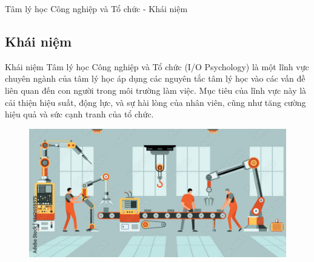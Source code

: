 \documentclass[../main.tex]{subfiles}
\begin{document}
\begin{frame}{Tâm lý học Công nghiệp và Tổ chức - Khái niệm}

\subsection{Khái niệm}
\begin{block}{Khái niệm}
    Tâm lý học Công nghiệp và Tổ chức (I/O Psychology) là một lĩnh vực chuyên ngành của tâm lý học áp dụng các nguyên tắc tâm lý học vào các vấn đề liên quan đến con người trong môi trường làm việc. Mục tiêu của lĩnh vực này là cải thiện hiệu suất, động lực, và sự hài lòng của nhân viên, cũng như tăng cường hiệu quả và sức cạnh tranh của tổ chức.
\end{block}
\begin{figure}
    \centering
    \includegraphics[width=0.7\linewidth]{anh/assembly_line.jpg}
\end{figure}
\end{frame}
\end{document}
